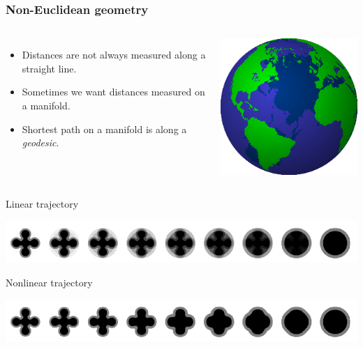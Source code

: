 \begin{frame}
\frametitle{Non-Euclidean geometry}
\begin{columns}[c]
\begin{itemize}
\item Distances are not always measured along a straight line.\par
\item Sometimes we want distances measured on a manifold.\par
\item Shortest path on a manifold is along a \emph{geodesic}.
\end{itemize}
\includegraphics[width=\textwidth]{Globe}
\end{columns}

\vspace{0.25cm}
Linear trajectory\par
\includegraphics[width=\textwidth]{series1}\par
Nonlinear trajectory\par
\includegraphics[width=\textwidth]{series2}\par
\end{frame}

